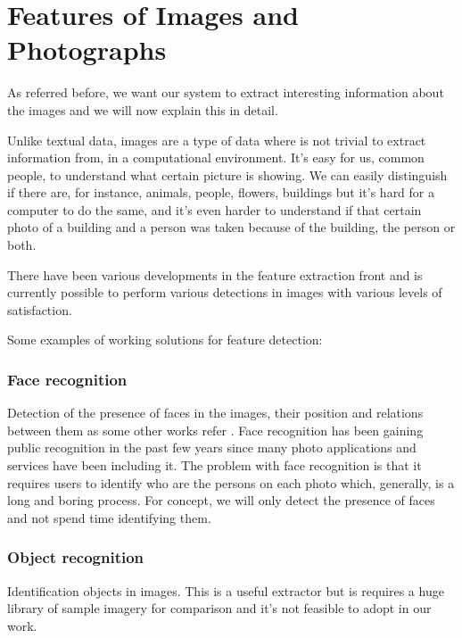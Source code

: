 



\section{Features of Images and Photographs}
\label{reqs:features}

As referred before, we want our system to extract interesting information about the images and we will now explain this in detail.


Unlike textual data, images are a type of data where is not trivial to extract information from, in a computational environment. It's easy for us, common people, to understand what certain picture is showing. We can easily distinguish if there are, for instance, animals, people, flowers, buildings but it's hard for a computer to do the same, and it's even harder to understand if that certain photo of a building and a person was taken because of the building, the person or both.

There have been various developments in the feature extraction front \cite{Liu:2007p3740,Datta:2005p3749,Rui:1999p949} and is currently possible to perform various detections in images with various levels of satisfaction.

Some examples of working solutions for feature detection:

\subsubsection{Face recognition}
Detection of the presence of faces in the images, their position and relations between them as some other works refer \cite{Vasconcelos:2005in,Chen:2003p3699,Tamura:2002p859,Hsu:2002p3675}. Face recognition has been gaining public recognition in the past few years since many photo applications and services have been including it. The problem with face recognition is that it requires users to identify who are the persons on each photo which, generally, is a long and boring process. For concept, we will only detect the presence of faces and not spend time identifying them.

\subsubsection{Object recognition}
Identification objects in images. This is a useful extractor but is requires a huge library of sample imagery for comparison \cite{Torralba:2008p527} and it's not feasible to adopt in our work.
	
